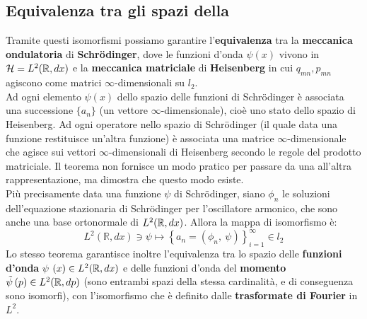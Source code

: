 \documentclass[FisicaTeorica.tex]{subfiles}
\begin{document}
\subsection{Equivalenza tra gli spazi della \MQ}
Tramite questi isomorfismi  possiamo garantire l'\textbf{equivalenza} tra la \textbf{meccanica ondulatoria} di \textbf{Schrödinger}, dove le funzioni d'onda $\psi(x)$ vivono in $\mathcal{H}=L^2(\mathbb{R}, dx)$ e la \textbf{meccanica matriciale} di \textbf{Heisenberg} in cui $q_{mn}, p_{mn}$ agiscono come matrici $\infty$-dimensionali su $l_2$.\\
Ad ogni elemento $\psi(x)$ dello spazio delle funzioni di Schrödinger è associata una successione $\{a_n\}$ (un vettore $\infty$-dimensionale), cioè uno stato dello spazio di Heisenberg. Ad ogni operatore nello spazio di Schrödinger (il quale data una funzione restituisce un'altra funzione) è associata una matrice $\infty$-dimensionale che agisce sui vettori $\infty$-dimensionali di Heisenberg secondo le regole del prodotto matriciale. Il teorema non fornisce un modo pratico per passare da una all'altra rappresentazione, ma dimostra che questo modo esiste. \\
Più precisamente data una funzione $\psi$ di Schrödinger, siano $\phi_n$ le soluzioni dell'equazione stazionaria di Schrödinger per l'oscillatore armonico, che sono anche una base ortonormale di $L^2(\mathbb{R}, dx)$. Allora la mappa di isomorfismo è:
\[
L^2\left(\mathbb R,dx\right)\ni\psi \mapsto \left\{a_n=\left(\phi_n,\ \psi\right)\right\}_{i=1}^\infty\in l_2
\]
Lo stesso teorema garantisce inoltre l'equivalenza tra lo spazio delle \textbf{funzioni d'onda} $\psi$ $\left(x\right)\in L^2(\mathbb{R}, dx)$ e delle funzioni d'onda del \textbf{momento} $\tilde{\psi}\left(p\right)\in L^2(\mathbb{R},dp)$ (sono entrambi spazi della stessa cardinalità, e di conseguenza sono isomorfi), con l'isomorfismo che è definito dalle \textbf{trasformate di Fourier} in $L^2$.\\
\end{document}
